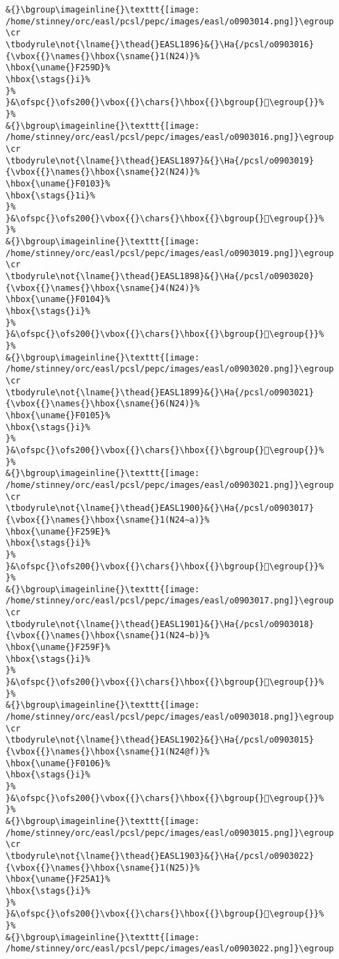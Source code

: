 \begin{verbatim}
&{}\bgroup\imageinline{}\texttt{[image: /home/stinney/orc/easl/pcsl/pepc/images/easl/o0903014.png]}\egroup
\cr
\tbodyrule\not{\lname{}\thead{}EASL1896}&{}\Ha{/pcsl/o0903016}{\vbox{{}\names{}\hbox{\sname{}1(N24)}%
\hbox{\uname{}F259D}%
\hbox{\stags{}i}%
}%
}&\ofspc{}\ofs200{}\vbox{{}\chars{}\hbox{{}\bgroup{}󲖝\egroup{}}%
}%
&{}\bgroup\imageinline{}\texttt{[image: /home/stinney/orc/easl/pcsl/pepc/images/easl/o0903016.png]}\egroup
\cr
\tbodyrule\not{\lname{}\thead{}EASL1897}&{}\Ha{/pcsl/o0903019}{\vbox{{}\names{}\hbox{\sname{}2(N24)}%
\hbox{\uname{}F0103}%
\hbox{\stags{}1i}%
}%
}&\ofspc{}\ofs200{}\vbox{{}\chars{}\hbox{{}\bgroup{}󰄃\egroup{}}%
}%
&{}\bgroup\imageinline{}\texttt{[image: /home/stinney/orc/easl/pcsl/pepc/images/easl/o0903019.png]}\egroup
\cr
\tbodyrule\not{\lname{}\thead{}EASL1898}&{}\Ha{/pcsl/o0903020}{\vbox{{}\names{}\hbox{\sname{}4(N24)}%
\hbox{\uname{}F0104}%
\hbox{\stags{}i}%
}%
}&\ofspc{}\ofs200{}\vbox{{}\chars{}\hbox{{}\bgroup{}󰄄\egroup{}}%
}%
&{}\bgroup\imageinline{}\texttt{[image: /home/stinney/orc/easl/pcsl/pepc/images/easl/o0903020.png]}\egroup
\cr
\tbodyrule\not{\lname{}\thead{}EASL1899}&{}\Ha{/pcsl/o0903021}{\vbox{{}\names{}\hbox{\sname{}6(N24)}%
\hbox{\uname{}F0105}%
\hbox{\stags{}i}%
}%
}&\ofspc{}\ofs200{}\vbox{{}\chars{}\hbox{{}\bgroup{}󰄅\egroup{}}%
}%
&{}\bgroup\imageinline{}\texttt{[image: /home/stinney/orc/easl/pcsl/pepc/images/easl/o0903021.png]}\egroup
\cr
\tbodyrule\not{\lname{}\thead{}EASL1900}&{}\Ha{/pcsl/o0903017}{\vbox{{}\names{}\hbox{\sname{}1(N24∼a)}%
\hbox{\uname{}F259E}%
\hbox{\stags{}i}%
}%
}&\ofspc{}\ofs200{}\vbox{{}\chars{}\hbox{{}\bgroup{}󲖞\egroup{}}%
}%
&{}\bgroup\imageinline{}\texttt{[image: /home/stinney/orc/easl/pcsl/pepc/images/easl/o0903017.png]}\egroup
\cr
\tbodyrule\not{\lname{}\thead{}EASL1901}&{}\Ha{/pcsl/o0903018}{\vbox{{}\names{}\hbox{\sname{}1(N24∼b)}%
\hbox{\uname{}F259F}%
\hbox{\stags{}i}%
}%
}&\ofspc{}\ofs200{}\vbox{{}\chars{}\hbox{{}\bgroup{}󲖟\egroup{}}%
}%
&{}\bgroup\imageinline{}\texttt{[image: /home/stinney/orc/easl/pcsl/pepc/images/easl/o0903018.png]}\egroup
\cr
\tbodyrule\not{\lname{}\thead{}EASL1902}&{}\Ha{/pcsl/o0903015}{\vbox{{}\names{}\hbox{\sname{}1(N24@f)}%
\hbox{\uname{}F0106}%
\hbox{\stags{}i}%
}%
}&\ofspc{}\ofs200{}\vbox{{}\chars{}\hbox{{}\bgroup{}󰄆\egroup{}}%
}%
&{}\bgroup\imageinline{}\texttt{[image: /home/stinney/orc/easl/pcsl/pepc/images/easl/o0903015.png]}\egroup
\cr
\tbodyrule\not{\lname{}\thead{}EASL1903}&{}\Ha{/pcsl/o0903022}{\vbox{{}\names{}\hbox{\sname{}1(N25)}%
\hbox{\uname{}F25A1}%
\hbox{\stags{}i}%
}%
}&\ofspc{}\ofs200{}\vbox{{}\chars{}\hbox{{}\bgroup{}󲖡\egroup{}}%
}%
&{}\bgroup\imageinline{}\texttt{[image: /home/stinney/orc/easl/pcsl/pepc/images/easl/o0903022.png]}\egroup

\end{verbatim}
